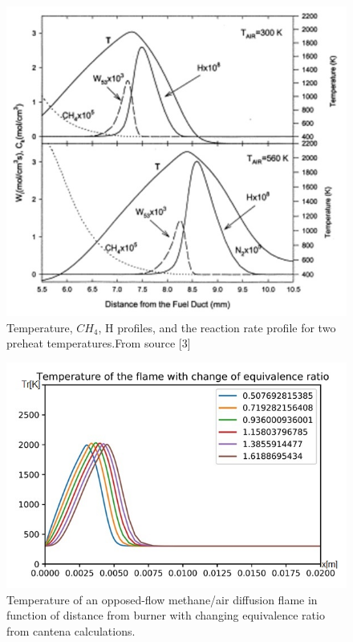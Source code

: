 \documentclass[a4paper]{article}
\begin{document}
\begin{figure}
\includegraphics[width=1\textwidth]{2.jpg}
\caption{\label{fig:2}Temperature, $CH_4$, H profiles, and the reaction rate profile for two preheat temperatures.From source [3]}
\end{figure}

\begin{figure}
\includegraphics[width=1\textwidth]{3.jpg}
\caption{\label{fig:3}Temperature of an opposed-flow methane/air diffusion flame in function of distance from burner with changing equivalence ratio from cantena calculations.}
\end{figure}
\end{document}

